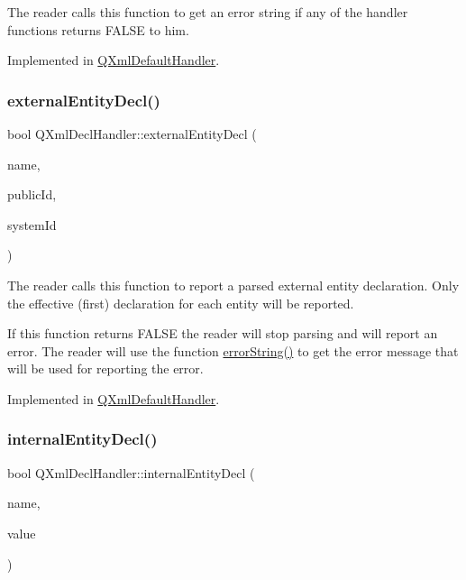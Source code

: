 The reader calls this function to get an error string if any of the handler functions returns F\+A\+L\+SE to him. 

Implemented in \mbox{\hyperlink{class_q_xml_default_handler_afcbe5fdce86cea4b7863e752c2413c45}{Q\+Xml\+Default\+Handler}}.

\mbox{\label{class_q_xml_decl_handler_ae12d792c249eb6f92c54b2e1734fd60f}} 
\subsubsection{\texorpdfstring{externalEntityDecl()}{externalEntityDecl()}}
{\footnotesize\ttfamily bool Q\+Xml\+Decl\+Handler\+::external\+Entity\+Decl (\begin{DoxyParamCaption}\item[{const \mbox{\hyperlink{class_q_string}{Q\+String}} \&}]{name,  }\item[{const \mbox{\hyperlink{class_q_string}{Q\+String}} \&}]{public\+Id,  }\item[{const \mbox{\hyperlink{class_q_string}{Q\+String}} \&}]{system\+Id }\end{DoxyParamCaption})\hspace{0.3cm}{\ttfamily [pure virtual]}}

The reader calls this function to report a parsed external entity declaration. Only the effective (first) declaration for each entity will be reported.

If this function returns F\+A\+L\+SE the reader will stop parsing and will report an error. The reader will use the function \mbox{\hyperlink{class_q_xml_decl_handler_a92d52f5e57b8041a956c30b92dd28161}{error\+String()}} to get the error message that will be used for reporting the error. 

Implemented in \mbox{\hyperlink{class_q_xml_default_handler_ac66a6f6bd7275b4515c21c6542a84138}{Q\+Xml\+Default\+Handler}}.

\mbox{\label{class_q_xml_decl_handler_ae54a0fbdcd4314143bf556ce5bfac597}} 
\subsubsection{\texorpdfstring{internalEntityDecl()}{internalEntityDecl()}}
{\footnotesize\ttfamily bool Q\+Xml\+Decl\+Handler\+::internal\+Entity\+Decl (\begin{DoxyParamCaption}\item[{const \mbox{\hyperlink{class_q_string}{Q\+String}} \&}]{name,  }\item[{const \mbox{\hyperlink{class_q_string}{Q\+String}} \&}]{value }\end{DoxyParamCaption})\hspace{0.3cm}{\ttfamily [pure virtual]}}

